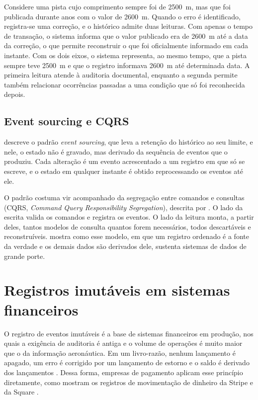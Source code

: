 Considere uma pista cujo comprimento sempre foi de 2500~m, mas que foi publicada durante anos com o valor de 2600~m. Quando o erro é identificado, registra-se uma correção, e o histórico admite duas leituras. Com apenas o tempo de transação, o sistema informa que o valor publicado era de 2600~m até a data da correção, o que permite reconstruir o que foi oficialmente informado em cada instante. Com os dois eixos, o sistema representa, ao mesmo tempo, que a pista sempre teve 2500~m e que o registro informava 2600~m até determinada data. A primeira leitura atende à auditoria documental, enquanto a segunda permite também relacionar ocorrências passadas a uma condição que só foi reconhecida depois.

\subsection{Event sourcing e CQRS}\label{sec:event-sourcing}

 descreve o padrão \textit{event sourcing}, que leva a retenção do histórico ao seu limite, e nele, o estado não é gravado, mas derivado da sequência de eventos que o produziu. Cada alteração é um evento acrescentado a um registro em que só se escreve, e o estado em qualquer instante é obtido reprocessando os eventos até ele.

O padrão costuma vir acompanhado da segregação entre comandos e consultas (CQRS, \textit{Command Query Responsibility Segregation}), descrita por . O lado da escrita valida os comandos e registra os eventos. O lado da leitura monta, a partir deles, tantos modelos de consulta quantos forem necessários, todos descartáveis e reconstruíveis.  mostra como esse modelo, em que um registro ordenado é a fonte da verdade e os demais dados são derivados dele, sustenta sistemas de dados de grande porte.

\section{Registros imutáveis em sistemas financeiros}\label{sec:financeiro}

O registro de eventos imutáveis é a base de sistemas financeiros em produção, nos quais a exigência de auditoria é antiga e o volume de operações é muito maior que o da informação aeronáutica. Em um livro-razão, nenhum lançamento é apagado, um erro é corrigido por um lançamento de estorno e o saldo é derivado dos lançamentos \cite{helland2016}. Dessa forma, empresas de pagamento aplicam esse princípio diretamente, como mostram os registros de movimentação de dinheiro da Stripe \cite{ganelin2024} e da Square \cite{strzalkowski2019}.

